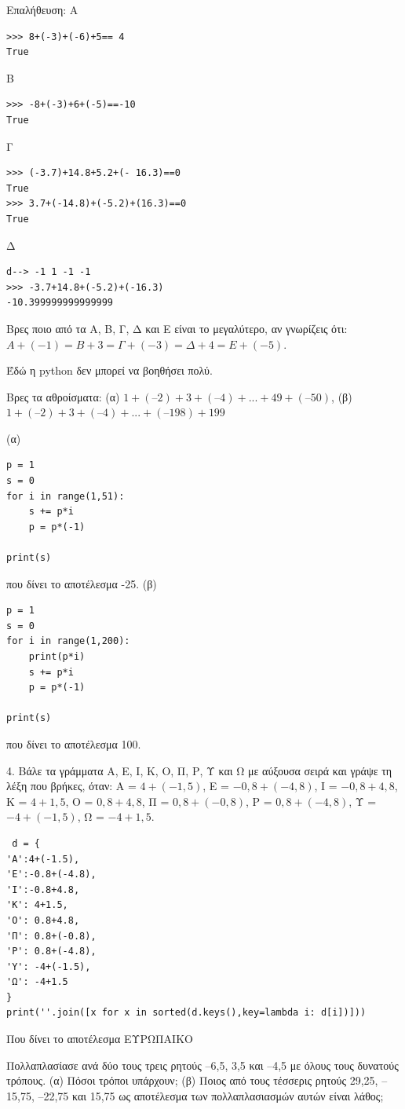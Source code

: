 Επαλήθευση:
A
\begin{lstlisting}
>>> 8+(-3)+(-6)+5== 4
True
\end{lstlisting}
B
\begin{lstlisting}
>>> -8+(-3)+6+(-5)==-10
True
\end{lstlisting}
Γ
\begin{lstlisting}
>>> (-3.7)+14.8+5.2+(- 16.3)==0 
True
>>> 3.7+(-14.8)+(-5.2)+(16.3)==0
True
\end{lstlisting}
Δ
\begin{lstlisting}
d--> -1 1 -1 -1
>>> -3.7+14.8+(-5.2)+(-16.3)
-10.399999999999999
\end{lstlisting}
\begin{exercise}
Βρες ποιο  από τα  Α,  Β,  Γ,  Δ και Ε είναι το  μεγαλύτερο, αν  γνωρίζεις ότι:
 $Α + (-1) = Β + 3 = Γ + (-3) = Δ + 4 = Ε + (-5)$.
 \end{exercise}
 Έδώ η python δεν μπορεί να βοηθήσει πολύ.
 \begin{exercise}
Βρες  τα  αθροίσματα:
 (α) $1+(–2)+3+(–4)+ ... +49+(–50)$, (β) $1+(–2)+3+(–4)+ ... +(–198)+199$
\end{exercise}
(α)
\begin{lstlisting}
p = 1
s = 0
for i in range(1,51):
    s += p*i
    p = p*(-1)

print(s)
\end{lstlisting}
που δίνει το αποτέλεσμα -25.
(β)
\begin{lstlisting}
p = 1
s = 0
for i in range(1,200):
    print(p*i)
    s += p*i
    p = p*(-1)

print(s)
\end{lstlisting}
που δίνει το αποτέλεσμα 100.
 \begin{exercise}
 4. Βάλε  τα  γράμματα  Α,  Ε,  Ι,  Κ,  Ο,  Π,  Ρ,  Υ και Ω με  αύξουσα σειρά και γράψε τη  λέξη
       που  βρήκες, όταν: Α = $4+(-1,5)$, Ε = $-0,8+(-4,8)$, Ι = $-0,8+4,8$, Κ = $4+1,5$,
 Ο = $0,8+4,8$, Π = $0,8+(-0,8)$, Ρ = $0,8+(-4,8)$, Υ = $-4+(-1,5)$, Ω = $-4+1,5$.
 \end{exercise}
 \begin{lstlisting}
 d = {
'Α':4+(-1.5),
'Ε':-0.8+(-4.8),
'I':-0.8+4.8,
'Κ': 4+1.5,
'Ο': 0.8+4.8,
'Π': 0.8+(-0.8),
'Ρ': 0.8+(-4.8),
'Υ': -4+(-1.5),
'Ω': -4+1.5
}
print(''.join([x for x in sorted(d.keys(),key=lambda i: d[i])]))
\end{lstlisting}
Που δίνει το αποτέλεσμα ΕΥΡΩΠΑΙΚΟ
\begin{exercise}
 Πολλαπλασίασε ανά δύο τους  τρεις ρητούς  –6,5, 3,5 και –4,5  με  όλους τους  δυνατούς
   τρόπους. (α) Πόσοι τρόποι  υπάρχουν; (β) Ποιος από τους  τέσσερις  ρητούς  29,25,
       –15,75,  –22,75  και 15,75 ως  αποτέλεσμα  των πολλαπλασιασμών αυτών είναι λάθος;
\end{exercise}
